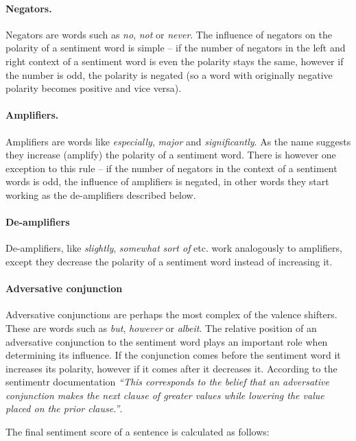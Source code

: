 \paragraph{Negators.} Negators are words such as \textit{no}, \textit{not} or \textit{never}. The influence of negators on the polarity of a sentiment word is simple -- if the number of negators in the left and right context of a sentiment word is even the polarity stays the same, however if the number is odd, the polarity is negated (so a word with originally negative polarity becomes positive and vice versa).

\paragraph{Amplifiers.} Amplifiers are words like \textit{especially}, \textit{major} and \textit{significantly}. As the name suggests they increase (amplify) the polarity of a sentiment word. There is however one exception to this rule -- if the number of negators in the context of a sentiment words is odd, the influence of amplifiers is negated, in other words they start working as the de-amplifiers described below.

\paragraph{De-amplifiers} De-amplifiers, like \textit{slightly}, \textit{somewhat} \textit{sort of} etc. work analogously to amplifiers, except they decrease the polarity of a sentiment word instead of increasing it.

\paragraph{Adversative conjunction} Adversative conjunctions are perhaps the most complex of the valence shifters. These are words such as \textit{but}, \textit{however} or  \textit{albeit}. The relative position of an adversative conjunction to the sentiment word plays an important role when determining its influence. If the conjunction comes before the sentiment word it increases its polarity, however if it comes after it decreases it. According to the sentimentr documentation \textit{``This corresponds to the belief that an adversative conjunction makes the next clause of greater values while lowering the value placed on the prior clause.''}. \cite{sentimentr}


The final sentiment score of a sentence is calculated as follows:

